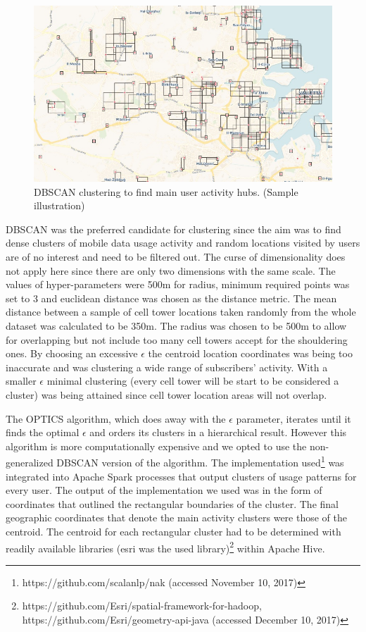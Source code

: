 \documentclass[12pt, a4paper]{report}
\theoremstyle{definition}
\theoremstyle{definition}%
\theoremstyle{definition}%
\theoremstyle{definition}%
\theoremstyle{definition}%
\theoremstyle{definition}%
\begin{document}
\begin{figure}[!]	
	\includegraphics[scale=0.60]{clustering.jpg}
	\centering
	\caption[DBSCAN clustering]{DBSCAN clustering to find main user activity hubs. (Sample illustration)}
	\label{fig:db_scan_clustering}
\end{figure}
 

DBSCAN was the preferred candidate for clustering since the aim was to find dense clusters of mobile data usage activity and random locations visited by users are of no interest and need to be filtered out. The curse of dimensionality does not apply here since there are only two dimensions with the same scale.  The values of hyper-parameters were 500m for radius, minimum required points was set to 3 and euclidean distance was chosen as the distance metric. The mean distance between a sample of cell tower locations taken randomly from the whole dataset was calculated to be 350m. The radius was chosen to be 500m to allow for overlapping but not include too many cell towers accept for the shouldering ones. By choosing an excessive $\epsilon$ the centroid location coordinates was being too inaccurate and was clustering a wide range of subscribers' activity. With a smaller $\epsilon$ minimal clustering (every cell tower will be start to be considered a cluster) was being attained since cell tower location areas will not overlap. 

The OPTICS algorithm, which does away with the $\epsilon$ parameter, iterates until it finds the optimal $\epsilon$ and orders its clusters in a hierarchical result. However this algorithm is more computationally expensive and we opted to use the non-generalized DBSCAN version of the algorithm. The implementation used\footnote{https://github.com/scalanlp/nak (accessed November 10, 2017)} was integrated into Apache Spark processes that output clusters of usage patterns for every user. The output of the implementation we used was in the form of coordinates that outlined the rectangular boundaries of the cluster. The final geographic coordinates that denote the main activity clusters were those of the centroid. The centroid for each rectangular cluster had to be determined with readily available libraries (esri was the used library)\footnote{https://github.com/Esri/spatial-framework-for-hadoop, https://github.com/Esri/geometry-api-java (accessed December 10, 2017)} within Apache Hive. 
\end{document}

